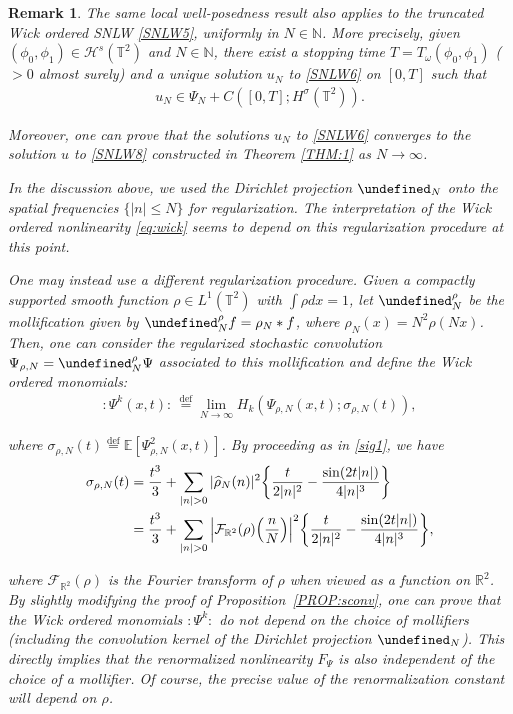 \documentclass[letterpaper, 11pt,  reqno]{amsart}
\newtheorem{remark}[theorem]{Remark}
\newcommand{\1}{\hspace{0.5mm}\text{I}\hspace{0.5mm}}
\newcommand{\noi}{\noindent}
\newcommand{\R}{\mathbb{R}}
\newcommand{\T}{\mathbb{T}}
\let\P= \undefined
\newcommand{\P}{\mathbf{P}}
\newcommand{\E}{\mathbb{E}}
\newcommand{\F}{\mathcal{F}}
\newcommand{\s}{\sigma}
\newcommand{\ft}{\widehat}
\renewcommand{\o}{\omega}
\newcommand{\N}{\mathbb{N}}
\renewcommand{\H}{\mathcal{H}}
\numberwithin{equation}{section}
\numberwithin{theorem}{section}
\begin{document}
\begin{remark}\label{REM:thm1} \rm
The same local well-posedness result
also applies to the truncated Wick ordered SNLW \eqref{SNLW5},
uniformly in $N \in \N$.
More precisely, given 
 $(\phi_0, \phi_1) \in \H^s(\T^2)$
and $N \in \N$, 
there exist
a stopping time $T = T_\o(\phi_0, \phi_1)$ ($>0$ almost surely)
and 
a unique solution $u_N $ to \eqref{SNLW6} on $[0, T]$
such that 
\begin{align*}
u_N \in 
 \Psi_N + C([0, T]; H^\s(\T^2) ) .
\end{align*}
	

\noi
Moreover, 
one can prove that 
the solutions $u_N$ to \eqref{SNLW6} converges to the solution $u$ to \eqref{SNLW8}
constructed in Theorem \ref{THM:1} as $N \to \infty$.

In the discussion above, we used the Dirichlet projection $\P_N$
onto the spatial frequencies $\{|n|\leq N\}$
for regularization.
The interpretation of the Wick ordered nonlinearity \eqref{eq:wick}
seems to depend on this regularization procedure at this point.

One may instead use a different regularization procedure. 
Given a compactly supported smooth function $\rho \in L^1(\T^2)$ with $\int \rho dx = 1$,
let $\P^\rho_N$ be the mollification given by 
$\P^\rho_N f = \rho_N * f$,
where $\rho_N(x) = N^2\rho(N x)$.
Then, one can consider the regularized stochastic convolution 
$\Psi_{\rho, N}  = \P^\rho_N \Psi$
associated to this mollification
and define the Wick ordered monomials:
\begin{align*}
:\! \Psi^k (x, t) \!: \,      \stackrel{\text{def}}= \lim_{N\to \infty}   H_k(\Psi_{\rho, N}(x, t);\sigma_{\rho,N}(t)), 
\end{align*}

\noi
where $\sigma_{\rho,N}(t) \stackrel{\text{def}}{=} \E[\Psi_{\rho, N}^2(x, t)]$.
By proceeding as in \eqref{sig1}, we have
\begin{align*}
\s_{\rho, N}(t) 
& = \frac{t^3}{3} +  \sum_{ |n| >0} | \ft \rho_N(n)|^2 \bigg\{ \frac{t}{2 |n|^2} 
- \frac{\sin (2 t |n|)}{4|n|^3 }\bigg\} \notag\\
& = \frac{t^3}{3} +  \sum_{ |n| >0} \Big| \F_{\R^2}( \rho)\Big(\frac{n}{N}\Big)\Big|^2 \bigg\{ \frac{t}{2 |n|^2} 
- \frac{\sin (2 t |n|)}{4|n|^3 }\bigg\}, 
\end{align*}



\noi
where  $\F_{\R^2}( \rho)$ is the Fourier transform of $\rho$
when viewed as a function on $\R^2$.
By slightly modifying the proof of Proposition~\ref{PROP:sconv}, 
one can  prove that the Wick ordered monomials
$:\! \Psi^k  \!: $ do not depend on 
the choice of mollifiers (including the convolution kernel of the Dirichlet projection $\P_N$). 
This directly implies that the renormalized nonlinearity $F_\Psi$ is also 
independent of the choice of a mollifier. Of course, the precise value of the renormalization constant 
will depend on $\rho$.

\end{remark}
\end{document}
